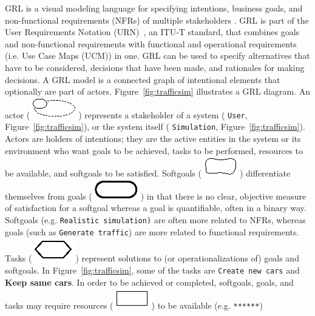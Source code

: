 GRL is a visual modeling language for specifying intentions, business goals, and non-functional requirements (NFRs) of multiple stakeholders \cite{Amyot:2010:EGM:1841349.1841356}. GRL is part of the User Requirements Notation (URN)~\cite{}, an ITU-T standard, that combines goals and non-functional requirements with functional and operational requirements (i.e. Use Case Maps (UCM)) in one.  GRL can be used to specify alternatives that have to be considered, decisions that have been made, and rationales for making decisions. A GRL model is a connected graph of intentional elements that optionally are part of actors. Figure~\ref{fig:trafficsim} illustrates a GRL diagram. An actor (\includegraphics[scale=1]{img/actor}) represents a stakeholder of a system ( \texttt{User}, Figure~\ref{fig:trafficsim}), or the system itself ( \texttt{Simulation}, Figure~\ref{fig:trafficsim}). Actors are holders of intentions; they are the active entities in the system or its environment who want goals to be achieved, tasks to be performed, resources to be available, and softgoals to be satisfied. Softgoals (\includegraphics[scale=1]{img/softgoal}) differentiate themselves from goals (\includegraphics[scale=1]{img/goal}) in that there is no clear, objective measure of satisfaction for a softgoal whereas a goal is quantifiable, often in a binary way. Softgoals (e.g.  \texttt{Realistic simulation)} are often more related to NFRs, whereas goals (such as  \texttt{Generate traffic}) are more related to functional requirements. Tasks (\includegraphics[scale=1]{img/task}) represent solutions to (or operationalizations of) goals and softgoals. In Figure~\ref{fig:trafficsim}, some of the tasks are  \texttt{Create new cars} and \textbf{Keep same cars}. In order to be achieved or completed, softgoals, goals, and tasks may require resources (\includegraphics[scale=1]{img/resource}) to be available (e.g.  \texttt{******}) %


